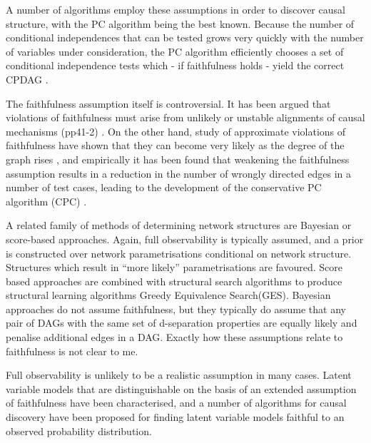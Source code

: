 A number of algorithms employ these assumptions in order to discover causal structure\cite{pearl_causality:_2009,spirtes_causation_1993}, with the PC algorithm being the best known. Because the number of conditional independences that can be tested grows very quickly with the number of variables under consideration\cite{matus_conditional_1995}, the PC algorithm efficiently chooses a set of conditional independence tests which - if faithfulness holds - yield the correct CPDAG \cite{spirtes_algorithm_1991}.

The faithfulness assumption itself is controversial. It has been argued that violations of faithfulness must arise from unlikely or unstable alignments of causal mechanisms  \cite{spirtes_causation_1993} (pp41-2) \cite{meek_strong_2013,pearl_causality:_2009}. On the other hand, study of approximate violations of faithfulness have shown that they can become very likely as the degree of the graph rises \cite{uhler_geometry_2013}, and empirically it has been found that weakening the faithfulness assumption results in a reduction in the number of wrongly directed edges in a number of test cases, leading to the development of the conservative PC algorithm (CPC) \cite{ramsey_adjacency-faithfulness_2012}.

A related family of methods of determining network structures are Bayesian or score-based approaches. Again, full observability is typically assumed, and a prior is constructed over network parametrisations conditional on network structure. Structures which result in ``more likely'' parametrisations are favoured\cite{heckerman_learning_1995,cooper_bayesian_1992,malone2014scoring}. Score based approaches are combined with structural search algorithms to produce structural learning algorithms Greedy Equivalence Search(GES)\cite{chickering_optimal_2003}. Bayesian approaches do not assume faithfulness, but they typically do assume that any pair of DAGs with the same set of d-separation properties are equally likely and penalise additional edges in a DAG. Exactly how these assumptions relate to faithfulness is not clear to me.

Full observability is unlikely to be a realistic assumption in many cases. Latent variable models that are distinguishable on the basis of an extended assumption of faithfulness have been characterised\cite{shpitser_identification_2006,evans_margins_2015}, and a number of algorithms for causal discovery have been proposed for finding latent variable models faithful to an observed probability distribution\cite{claassen_learning_2013,colombo_learning_2012,spirtes_causation_1993}.


